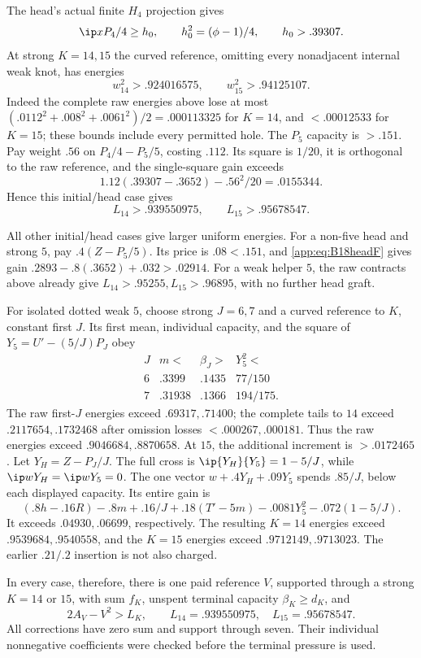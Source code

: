 The head's actual finite \(H_4\) projection gives
\[
 \ip x{P_4/4}\geq h_0,\qquad
 h_0^2=(\phi-1)/4,\qquad h_0>.39307.
\]
At strong \(K=14,15\) the curved reference, omitting every
nonadjacent internal weak knot, has energies
\[
 w_{14}^2>.924016575,\qquad w_{15}^2>.94125107.
\]
Indeed the complete raw energies above lose at most
\((.0112^2+.008^2+.0061^2)/2=.000113325\)
for \(K=14\), and \(<.00012533\) for \(K=15\);
these bounds include every permitted hole.
The \(P_5\) capacity is \(>.151\).
Pay weight \(.56\) on \(P_4/4-P_5/5\), costing \(.112\).
Its square is \(1/20\), it is orthogonal to the raw reference,
and the single-square gain exceeds
\[
 1.12(.39307-.3652)-.56^2/20=.0155344.
\]
Hence this initial/head case gives
\[
 L_{14}>.939550975,\qquad L_{15}>.95678547.
\]

All other initial/head cases give larger uniform energies.
For a non-five head and strong \(5\), pay \(.4(Z-P_5/5)\).
Its price is \(.08<.151\), and
\eqref{app:eq:B18headF} gives gain
\(.2893-.8(.3652)+.032>.02914\).
For a weak helper \(5\), the raw contracts above already
give \(L_{14}>.95255,L_{15}>.96895\), with no further head graft.

For isolated dotted weak \(5\), choose strong \(J=6,7\) and
a curved reference to \(K\), constant first \(J\).
Its first mean, individual capacity, and the square of
\(Y_5=U'-(5/J)P_J\) obey
\[
\begin{array}{c|ccc}
J&m<&\beta_J>&Y_5^2<\\ \hline
6&.3399&.1435&77/150\\
7&.31938&.1366&194/175 .
\end{array}
\]
The raw first-\(J\) energies exceed \(.69317,.71400\);
the complete tails to \(14\) exceed \(.2117654,.1732468\)
after omission losses \(<.000267,.000181\).
Thus the raw energies exceed \(.9046684,.8870658\).
At \(15\), the additional increment is \(>.0172465\).
Let \(Y_H=Z-P_J/J\). The full cross is
\(\ip{Y_H}{Y_5}=1-5/J\), while
\(\ip w{Y_H}=\ip w{Y_5}=0\).
The one vector \(w+.4Y_H+.09Y_5\) spends \(.85/J\),
below each displayed capacity. Its entire gain is
\[
 (.8h-.16R)-.8m+.16/J
 +.18(T'-5m)-.0081Y_5^2-.072(1-5/J).
\]
It exceeds \(.04930,.06699\), respectively. The resulting
\(K=14\) energies exceed \(.9539684,.9540558\), and the
\(K=15\) energies exceed \(.9712149,.9713023\).
The earlier \(.21/.2\) insertion is not also charged.

In every case, therefore, there is one paid reference \(V\),
supported through a strong \(K=14\) or \(15\), with sum \(f_K\),
unspent terminal capacity \(\beta_K\geq d_K\), and
\begin{equation}\label{app:eq:B18uniformprefix}
 2A_V-V^2>L_K,\qquad
 L_{14}=.939550975,\quad L_{15}=.95678547 .
\end{equation}
All corrections have zero sum and support through seven.
Their individual nonnegative coefficients were checked before
the terminal pressure is used.

